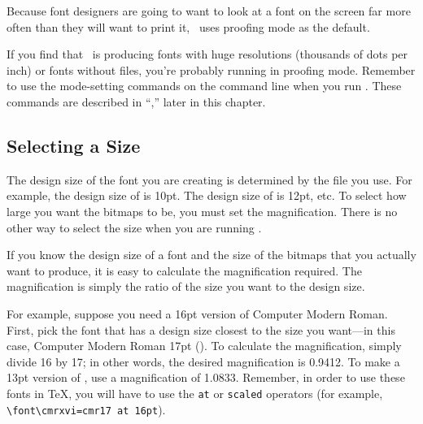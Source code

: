Because font designers are going to want to look at a font on the
screen far more often than they will want to print it, \MF\ uses 
proofing mode as the default.

If you find that \MF\ is producing fonts with huge resolutions
(thousands of dots per inch) or fonts without  files, you're 
probably running in proofing mode.
Remember to use the mode-setting commands on the command line when
you run \MF.  These commands are described in ``,''
later in this chapter.
%
%
%

\subsection{Selecting a Size}

The design size of 
the font you are creating is determined
by the  file you use.  For example, the design size of
 is 10pt.  The design size of 
is 12pt, etc.
To select how large you want the bitmaps to be, you must set
the magnification.  There is no other way to select the
size when you are running \MF.

\newpage
If you know the design size of a font and the size of the bitmaps that
you actually want to produce, it is easy to calculate the magnification
required.  The magnification is simply the ratio of the size
you want to the design size.

For example, suppose you need a 16pt version of Computer Modern Roman.
First, pick the font that has a design size closest to the size you
want---in this case, Computer Modern Roman 17pt
().  To calculate the magnification, simply
divide 16 by 17; in other words, the desired magnification is 0.9412.
To make a 13pt version of , use a magnification of 1.0833.
Remember, in order to use these fonts in \TeX, you will have to use the
\verb|at| or \verb|scaled| operators (for example, 
\verb|\font\cmrxvi=cmr17 at 16pt|).

